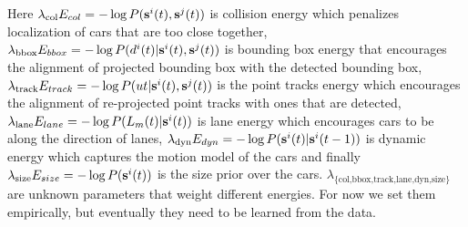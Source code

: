 %
Here $\lambda_{\text{col}}E_{col} = -\log P(\mathbf{s}^{i}(t), \mathbf{s}^{j}(t))$ is collision energy which penalizes localization of cars that are too close together, $\lambda_{\text{bbox}}E_{bbox} = -\log P(d^{i}(t) | \mathbf{s}^{i}(t), \mathbf{s}^{j}(t))$ is bounding box energy that encourages the alignment of projected bounding box with the detected bounding box, $\lambda_{\text{track}}E_{track} = -\log P(ut | \mathbf{s}^{i}(t), \mathbf{s}^{j}(t))$ is the point tracks energy which encourages the alignment of re-projected point tracks with ones that are detected, $\lambda_{\text{lane}}E_{lane} = - \log P(L_m(t) | \mathbf{s}^{i}(t))$ is lane energy which encourages cars to be along the direction of lanes, $\lambda_{\text{dyn}}E_{dyn} = - \log P( \mathbf{s}^{i}(t) | \mathbf{s}^{i}(t-1) ) $ is dynamic energy which captures the motion model of the cars and finally $\lambda_{\text{size}}E_{size} = - \log P (\mathbf{s}^{i}(t))$ is the size prior over the cars. $\lambda_{\text{\{col,bbox,track,lane,dyn,size\}}}$ are unknown parameters that weight different energies. For now we set them empirically, but eventually they need to be learned from the data.
